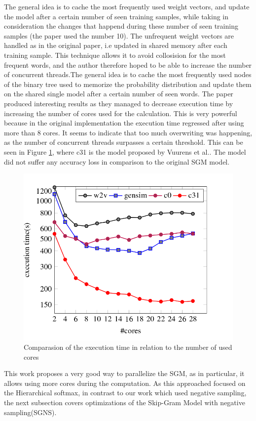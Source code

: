 The general idea is to cache the most frequently used weight vectors, and update the model after a certain number of seen training samples, while taking in consideration the changes that happend during these number of seen training samples (the paper used the number 10). The unfrequent weight vectors are handled as in the original paper, i.e updated in shared memory after each training sample. This technique  allows it to avoid collosision for the most frequent words, and the author therefore hoped to be able to increase the number of concurrent threads.The general idea is to cache the most frequently used nodes of the binary tree used to memorize the probability distribution and update them on the shared single model after a certain number of seen words. The paper produced interesting results as they managed to decrease execution time by increasing the number of cores used for the calculation. This is very powerful because in the original implementation the execution time regressed after using more than 8 cores. It seems to indicate that too much overwriting was happening, as the number of concurrent threads surpasses a certain threshold. This can be seen in Figure \ref{fig:efficient}, where c31 is the model proposed by Vuurens et al.\cite{efficient}. The model did not suffer any accuracy loss in comparison to the original SGM model.
\begin{figure}[ht]
\centering
\includegraphics[scale=0.3]{images/cachingEfficiency.png}
\caption{Comparasion of the execution time in relation to the number of used cores \cite{efficient}}
\label{fig:efficient}
\end{figure}
This work proposes a very good way to parallelize the SGM, as in particular, it allows using more cores during the computation. As this approached focused on the Hierarchical softmax, in contrast to our work which used negative sampling, the next subsection covers optimizations of the Skip-Gram Model with negative sampling(SGNS).

